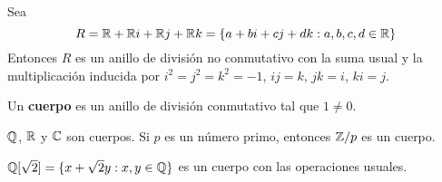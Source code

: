 \begin{example}
Sea 
\[
R=\mathbb{R}+\mathbb{R} i+\mathbb{R} j+\mathbb{R} k=\{a+bi+cj+dk:a,b,c,d\in\mathbb{R}\}
\]
Entonces $R$ es un anillo de división no conmutativo con la suma usual y 
la multiplicación inducida por 
$i^2=j^2=k^2=-1$, $ij=k$, $jk=i$, $ki=j$. 
\end{example}

\begin{definition}
Un \textbf{cuerpo} es un anillo de división conmutativo tal que $1\ne 0$.
\end{definition}

\begin{examples}
$\mathbb{Q}$, $\mathbb{R}$ y $\mathbb{C}$ son cuerpos. Si $p$ es un número primo, entonces $\mathbb{Z}/p$ es un cuerpo.	
\end{examples}

\begin{example}
$\mathbb{Q}[\sqrt{2}]=\{x+\sqrt{2}y:x,y\in\mathbb{Q}\}$ es un cuerpo con las operaciones usuales. 	
\end{example}







